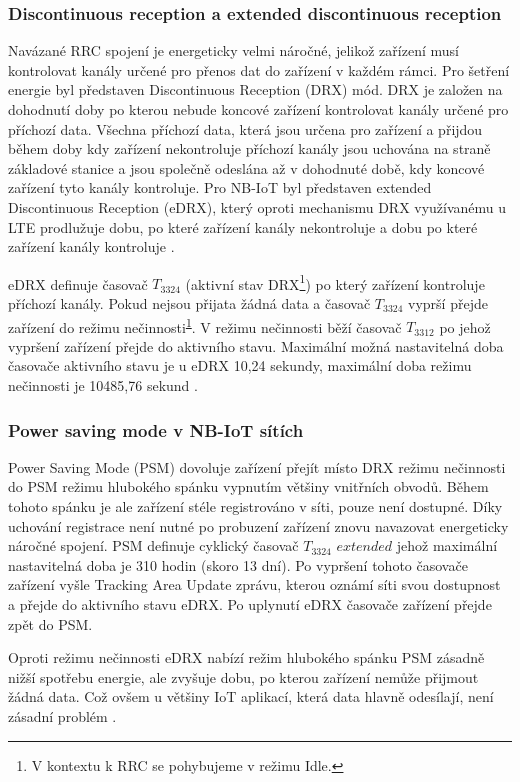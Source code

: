 \subsubsection{Discontinuous reception a extended discontinuous reception}
\par Navázané \acs{RRC} spojení je energeticky velmi náročné, jelikož zařízení musí kontrolovat kanály určené pro přenos dat do zařízení v každém rámci. Pro šetření energie byl představen Discontinuous Reception (DRX) mód. \acs{DRX} je založen na dohodnutí doby po kterou nebude koncové zařízení kontrolovat kanály určené pro příchozí data. Všechna příchozí data, která jsou určena pro zařízení a přijdou během doby kdy zařízení nekontroluje příchozí kanály jsou uchována na straně základové stanice a jsou společně odeslána až v dohodnuté době, kdy koncové zařízení tyto kanály kontroluje. Pro \acs{NB-IoT} byl představen extended Discontinuous Reception (eDRX), který oproti mechanismu \acs{DRX} využívanému u \acs{LTE} prodlužuje dobu, po které zařízení kanály nekontroluje a dobu po které zařízení kanály kontroluje \cite{RrOYwpS5DDx1VHpk, Sultania2018}.
\par \acs{eDRX} definuje časovač $T_{3324}$  (aktivní stav DRX\footnote{V kontextu k RRC se pohybujeme v režimu Idle.\label{footref}}) po který zařízení kontroluje příchozí kanály. Pokud nejsou přijata žádná data a časovač $T_{3324}$  vyprší přejde zařízení do režimu nečinnosti\textsuperscript{\ref{footref}}. V režimu nečinnosti běží časovač $T_{3312}$  po jehož vypršení zařízení přejde do aktivního stavu. Maximální možná nastavitelná doba časovače aktivního stavu je u \acs{eDRX} 10,24 sekundy, maximální doba režimu nečinnosti je 10485,76 sekund \cite{Sultania2018, 7PSDVU697EnNt2nN}.

\subsubsection{Power saving mode v \acs{NB-IoT} sítích }
\par Power Saving Mode (PSM) dovoluje zařízení přejít místo DRX režimu nečinnosti do PSM režimu hlubokého spánku vypnutím většiny vnitřních obvodů. Během tohoto spánku je ale zařízení stéle registrováno v síti, pouze není dostupné. Díky uchování registrace není nutné po probuzení zařízení znovu navazovat energeticky náročné spojení. \acs{PSM} definuje cyklický časovač $T_{3324}$ $extended$  jehož maximální nastavitelná doba je 310 hodin (skoro 13 dní). Po vypršení tohoto časovače zařízení vyšle Tracking Area Update zprávu, kterou oznámí síti svou dostupnost a přejde do aktivního stavu \acs{eDRX}. Po uplynutí \acs{eDRX} časovače zařízení přejde zpět do \acs{PSM}.
\par Oproti režimu nečinnosti \acs{eDRX} nabízí režim hlubokého spánku \acs{PSM} zásadně nižší spotřebu energie, ale zvyšuje dobu, po kterou zařízení nemůže přijmout žádná data. Což ovšem u většiny \acs{IoT} aplikací, která data hlavně odesílají, není zásadní problém \cite{Sultania2018}. 

